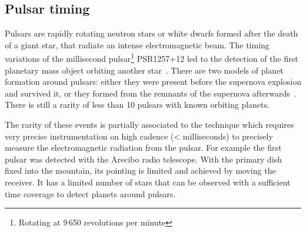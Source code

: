 \subsection{Pulsar timing}
\label{subsec:pulsar_timing}
Pulsars are rapidly rotating neutron stars or white dwarfs formed after the death of a giant star, that radiate an intense electromagnetic beam.
The timing variations of the millisecond pulsar\footnote{Rotating at 9\,650 revolutions per minute} {PSR1257+12} led to the detection of the first planetary mass object orbiting another star~\citep{wolszczan_planetary_1992}.
There are two models of planet formation around pulsars: either they were present before the supernova explosion and survived it, or they formed from the remnants of the supernova afterwards~\citep{starovoit_existence_2017}.
There is still a rarity of less than 10 pulsars with known orbiting planets.

The rarity of these events is partially associated to the technique which requires very precise instrumentation on high cadence (< milliseconds) to precisely measure the electromagnetic radiation from the pulsar.
For example the first pulsar was detected with the Arecibo radio telescope.
With the primary dish fixed into the mountain, its pointing is limited and achieved by moving the receiver.
It has a limited number of stars that can be observed with a sufficient time coverage to detect planets around pulsars.
